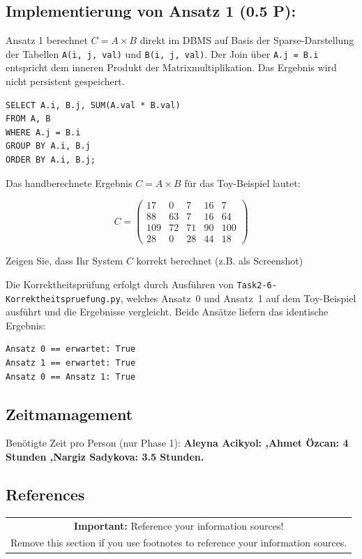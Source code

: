 \documentclass[11pt]{scrartcl}
\begin{document}
\subsection*{Implementierung von Ansatz 1 (0.5 P):}

Ansatz 1 berechnet $C = A \times B$ direkt im DBMS auf Basis der Sparse-Darstellung
der Tabellen \texttt{A(i, j, val)} und \texttt{B(i, j, val)}.
Der Join über \texttt{A.j = B.i} entspricht dem inneren Produkt der Matrixmultiplikation.
Das Ergebnis wird nicht persistent gespeichert.

\begin{lstlisting}[style=dmrsql]
SELECT A.i, B.j, SUM(A.val * B.val)
FROM A, B
WHERE A.j = B.i
GROUP BY A.i, B.j
ORDER BY A.i, B.j;
\end{lstlisting}

Das handberechnete Ergebnis $C = A \times B$ für das Toy-Beispiel lautet:

\[
C = \begin{pmatrix}
 17 &  0 &  7 & 16 &   7 \\
 88 & 63 &  7 & 16 &  64 \\
109 & 72 & 71 & 90 & 100 \\
 28 &  0 & 28 & 44 &  18
\end{pmatrix}
\]

Zeigen Sie, dass Ihr System $C$ korrekt berechnet (z.B. als Screenshot)

Die Korrektheitsprüfung erfolgt durch Ausführen von \texttt{Task2-6-Korrektheitspruefung.py},
welches Ansatz~0 und Ansatz~1 auf dem Toy-Beispiel ausführt und die Ergebnisse vergleicht.
Beide Ansätze liefern das identische Ergebnis:

\begin{lstlisting}[style=dmrsql]
Ansatz 0 == erwartet: True
Ansatz 1 == erwartet: True
Ansatz 0 == Ansatz 1: True
\end{lstlisting}

\subsection*{Zeitmamagement}

Benötigte Zeit pro Person (nur Phase 1): \textbf{Aleyna Acikyol: ,Ahmet Özcan: 4 Stunden ,Nargiz Sadykova: 3.5 Stunden.}

\subsection*{References}

\begin{table}[H]
  \centering
  \begin{tabular}{c}
    \hline
    \textbf{Important:} Reference your information sources! \tabularnewline
    Remove this section if you use footnotes to reference your information sources. \tabularnewline
    \hline
  \end{tabular}
\end{table}
\end{document}
